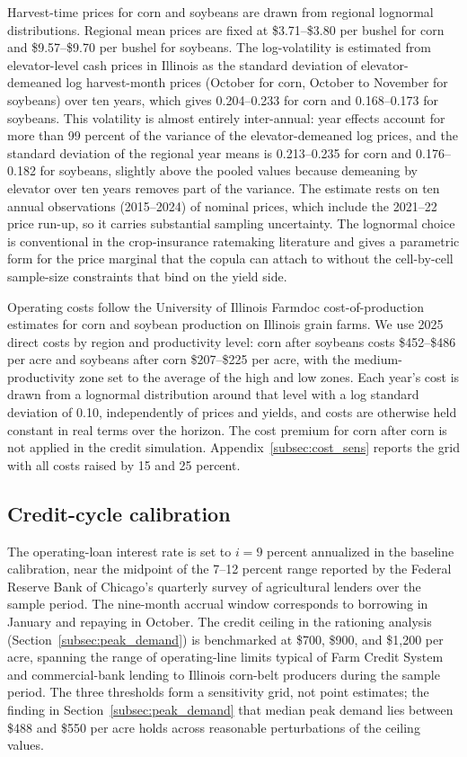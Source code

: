 \documentclass[11pt,letterpaper]{article}
\theoremstyle{remark}
\begin{document}
Harvest-time prices for corn and soybeans are drawn from regional lognormal distributions. Regional mean prices are fixed at \$3.71--\$3.80 per bushel for corn and \$9.57--\$9.70 per bushel for soybeans. The log-volatility is estimated from elevator-level cash prices in Illinois as the standard deviation of elevator-demeaned log harvest-month prices (October for corn, October to November for soybeans) over ten years, which gives 0.204--0.233 for corn and 0.168--0.173 for soybeans. This volatility is almost entirely inter-annual: year effects account for more than 99 percent of the variance of the elevator-demeaned log prices, and the standard deviation of the regional year means is 0.213--0.235 for corn and 0.176--0.182 for soybeans, slightly above the pooled values because demeaning by elevator over ten years removes part of the variance. The estimate rests on ten annual observations (2015--2024) of nominal prices, which include the 2021--22 price run-up, so it carries substantial sampling uncertainty. The lognormal choice is conventional in the crop-insurance ratemaking literature and gives a parametric form for the price marginal that the copula can attach to without the cell-by-cell sample-size constraints that bind on the yield side.
 
Operating costs follow the University of Illinois Farmdoc cost-of-production estimates for corn and soybean production on Illinois grain farms. We use 2025 direct costs by region and productivity level: corn after soybeans costs \$452--\$486 per acre and soybeans after corn \$207--\$225 per acre, with the medium-productivity zone set to the average of the high and low zones. Each year's cost is drawn from a lognormal distribution around that level with a log standard deviation of 0.10, independently of prices and yields, and costs are otherwise held constant in real terms over the horizon. The cost premium for corn after corn is not applied in the credit simulation. Appendix~\ref{subsec:cost_sens} reports the grid with all costs raised by 15 and 25 percent.
 
\subsection{\label{subsec:calibration}Credit-cycle calibration}
 
The operating-loan interest rate is set to $i = 9$ percent annualized in the baseline calibration, near the midpoint of the 7--12 percent range reported by the Federal Reserve Bank of Chicago's quarterly survey of agricultural lenders over the sample period. The nine-month accrual window corresponds to borrowing in January and repaying in October. The credit ceiling in the rationing analysis (Section~\ref{subsec:peak_demand}) is benchmarked at \$700, \$900, and \$1{,}200 per acre, spanning the range of operating-line limits typical of Farm Credit System and commercial-bank lending to Illinois corn-belt producers during the sample period. The three thresholds form a sensitivity grid, not point estimates; the finding in Section~\ref{subsec:peak_demand} that median peak demand lies between \$488 and \$550 per acre holds across reasonable perturbations of the ceiling values.
 
\end{document}
